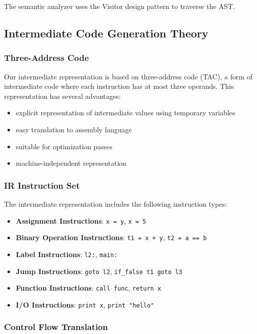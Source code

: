 \documentclass[12pt, letterpaper]{article}
\begin{document}
The semantic analyzer uses the Visitor design pattern to traverse the AST.\@

\subsection*{Intermediate Code Generation Theory}

\subsubsection*{Three-Address Code}

Our intermediate representation is based on three-address code (TAC), a form of intermediate code where each instruction has at most three operands. This representation has several advantages:

\begin{itemize}
    \item explicit representation of intermediate values using temporary variables
    \item easy translation to assembly language
    \item suitable for optimization passes
    \item machine-independent representation
\end{itemize}

\subsubsection*{IR Instruction Set}

The intermediate representation includes the following instruction types:

\begin{itemize}
    \item \textbf{Assignment Instructions}: \texttt{x = y}, \texttt{x = 5}
    \item \textbf{Binary Operation Instructions}: \texttt{t1 = x + y}, \texttt{t2 = a == b}
    \item \textbf{Label Instructions}: \texttt{l2:}, \texttt{main:}
    \item \textbf{Jump Instructions}: \texttt{goto l2}, \texttt{if\_false t1 goto l3}
    \item \textbf{Function Instructions}: \texttt{call func}, \texttt{return x}
    \item \textbf{I/O Instructions}: \texttt{print x}, \texttt{print "hello"}
\end{itemize}

\subsubsection*{Control Flow Translation}
\end{document}
